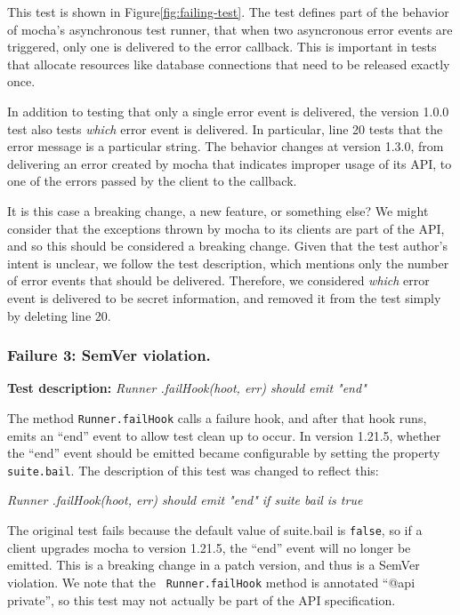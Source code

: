 This test is shown in Figure\~\ref{fig:failing-test}. The test defines
part of the behavior of mocha's asynchronous test runner, that when
two asyncronous error events are triggered, only one is delivered to
the error callback. This is important in tests that allocate resources
like database connections that need to be released exactly once.

In addition to testing that only a single error event is delivered,
the version 1.0.0 test also tests {\em which} error event is
delivered. In particular, line 20 tests that the error message is a
particular string. The behavior changes at version 1.3.0, from
delivering an error created by mocha that indicates improper usage of
its API, to one of the errors passed by the client to the callback.

It is this case a breaking change, a new feature, or something else?
We might consider that the exceptions thrown by mocha to its clients
are part of the API, and so this should be considered a breaking
change.  Given that the test author's intent is unclear, we follow the
test description, which mentions only the number of error events that
should be delivered. Therefore, we considered {\em which} error event
is delivered to be secret information, and removed it from the test
simply by deleting line 20.

\subsubsection{Failure 3: SemVer violation.}

{\bf Test description:}
%
{\em Runner .failHook(hoot, err) should emit "end" }

The method {\tt Runner.failHook} calls a failure hook, and after that
hook runs, emits an ``end'' event to allow test clean up to occur. In
version 1.21.5, whether the ``end'' event should be emitted became
configurable by setting the property {\tt suite.bail}.  The
description of this test was changed to reflect this:

{\em Runner .failHook(hoot, err) should emit "end" if suite bail is
  true }

The original test fails because the default value of suite.bail is
{\tt false}, so if a client upgrades mocha to version 1.21.5, the
``end'' event will no longer be emitted. This is a breaking change in
a patch version, and thus is a SemVer violation. We note that the {\tt
  Runner.failHook} method is annotated ``@api private'', so this test
may not actually be part of the API specification.

